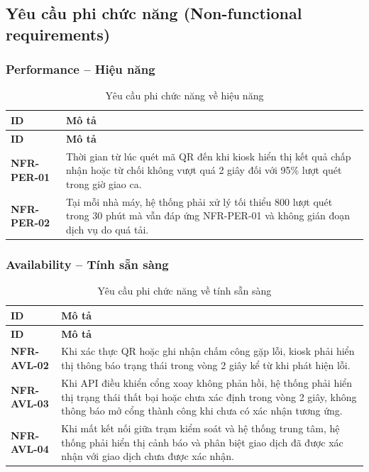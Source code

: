 \subsection{Yêu cầu phi chức năng (Non-functional requirements)}\label{sec:nfr}

\subsubsection{Performance -- Hiệu năng}
\begingroup
\small
\renewcommand{\arraystretch}{1.2}
\begin{longtable}{|>{\centering\arraybackslash}m{3cm}|>{\raggedright\arraybackslash}m{12.9cm}|}
    \caption{Yêu cầu phi chức năng về hiệu năng}\label{tab:nfr-performance}\\
    \hline
    \textbf{ID} & \textbf{Mô tả}\\
    \hline
    \endfirsthead
    \hline
    \textbf{ID} & \textbf{Mô tả}\\
    \hline
    \endhead
    \hline
    \endfoot
    \hline
    \endlastfoot
    \textbf{NFR-PER-01} & Thời gian từ lúc quét mã QR đến khi kiosk hiển thị kết quả chấp nhận hoặc từ chối không vượt quá 2 giây đối với 95\% lượt quét trong giờ giao ca.\\
    \hline
    \textbf{NFR-PER-02} & Tại mỗi nhà máy, hệ thống phải xử lý tối thiểu 800 lượt quét trong 30 phút mà vẫn đáp ứng NFR-PER-01 và không gián đoạn dịch vụ do quá tải.\\
    \hline
\end{longtable}
\endgroup

\subsubsection{Availability -- Tính sẵn sàng}
\begingroup
\small
\renewcommand{\arraystretch}{1.2}
\begin{longtable}{|>{\centering\arraybackslash}m{3cm}|>{\raggedright\arraybackslash}m{12.9cm}|}
    \caption{Yêu cầu phi chức năng về tính sẵn sàng}\label{tab:nfr-availability}\\
    \hline
    \textbf{ID} & \textbf{Mô tả}\\
    \hline
    \endfirsthead
    \hline
    \textbf{ID} & \textbf{Mô tả}\\
    \hline
    \endhead
    \hline
    \endfoot
    \hline
    \endlastfoot
    \textbf{NFR-AVL-02} & Khi xác thực QR hoặc ghi nhận chấm công gặp lỗi, kiosk phải hiển thị thông báo trạng thái trong vòng 2 giây kể từ khi phát hiện lỗi.\\
    \hline
    \textbf{NFR-AVL-03} & Khi API điều khiển cổng xoay không phản hồi, hệ thống phải hiển thị trạng thái thất bại hoặc chưa xác định trong vòng 2 giây, không thông báo mở cổng thành công khi chưa có xác nhận tương ứng.\\
    \hline
    \textbf{NFR-AVL-04} & Khi mất kết nối giữa trạm kiểm soát và hệ thống trung tâm, hệ thống phải hiển thị cảnh báo và phân biệt giao dịch đã được xác nhận với giao dịch chưa được xác nhận.\\
    \hline
\end{longtable}
\endgroup

